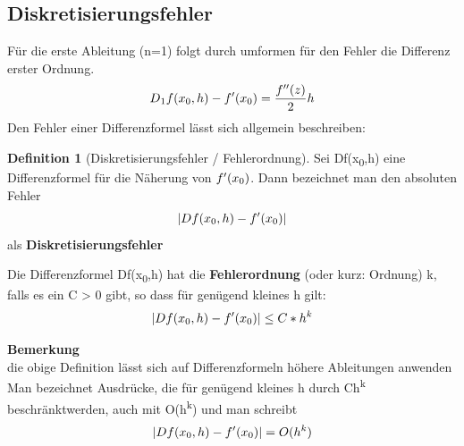 \documentclass{article}
\theoremstyle{satz}
\theoremstyle{definition}
\newtheorem{definition}{Definition}
\begin{document}
\subsection{Diskretisierungsfehler}
Für die erste Ableitung (n=1) folgt durch umformen für den Fehler die Differenz erster Ordnung.
\begin{equation}
D\textsubscript{1}f(x\textsubscript{0},h)-f'(x\textsubscript{0}) = \frac{f''(z)}{2}h
\end{equation}
Den Fehler einer Differenzformel lässt sich allgemein beschreiben:
\theoremstyle{definition}
\begin{definition}[Diskretisierungsfehler / Fehlerordnung]
\item{Sei Df(x\textsubscript{0},h) eine Differenzformel für die Näherung von $f'(x\textsubscript{0})$. Dann bezeichnet man den absoluten Fehler
\begin{equation}
| Df(x\textsubscript{0},h) - f'(x\textsubscript{0})|
\end{equation}
als \textbf{Diskretisierungsfehler}}
\item{Die Differenzformel Df(x\textsubscript{0},h) hat die \textbf{Fehlerordnung} (oder kurz: Ordnung) k, falls es ein C > 0 gibt, so dass für genügend kleines h gilt:
\begin{equation}
|Df(x\textsubscript{0},h)-f'(x\textsubscript{0})| \leq C * h^k
\end{equation}
}
\end{definition}
\textbf{Bemerkung} \\ die obige Definition lässt sich auf Differenzformeln höhere Ableitungen anwenden \\ Man bezeichnet Ausdrücke, die für genügend kleines h durch Ch\textsuperscript{k} beschränktwerden, auch mit O(h\textsuperscript{k}) und man schreibt 
\begin{equation}
|Df(x\textsubscript{0},h)-f'(x\textsubscript{0})| = O(h^k)
\end{equation}
\end{document}
